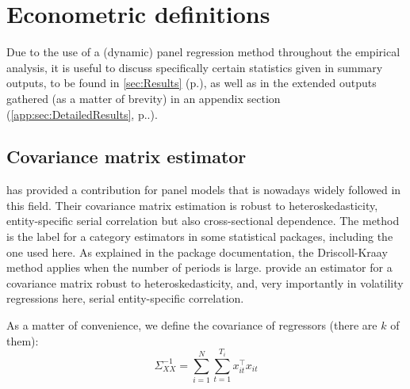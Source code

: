 \section{Econometric definitions}
\label{app:sec:EconometricDefinitions}
Due to the use of a (dynamic) panel regression method throughout the empirical analysis, it is useful to discuss specifically certain statistics given in summary outputs, to be found in \autoref{sec:Results} (p.\pageref{sec:Results}), as well as in the extended outputs gathered (as a matter of brevity) in an appendix section (\autoref{app:sec:DetailedResults}, p.\pageref{app:sec:DetailedResults}.).

\subsection{Covariance matrix estimator}
\textcite{Driscoll1998} has provided a contribution for panel models that is nowadays widely followed in this field. Their covariance matrix estimation is robust to heteroskedasticity, entity-specific serial correlation but also cross-sectional dependence. The method is the label for a category estimators in some statistical packages, including the one used here. As explained in the package documentation, the Driscoll-Kraay method applies when the number of periods is large. \textcite{Newey1987} provide an estimator for a covariance matrix robust to heteroskedasticity, and, very importantly in volatility regressions here, serial entity-specific correlation.

As a matter of convenience, we define the covariance of regressors (there are $k$ of them):
\begin{equation}
  \Sigma_{XX}^{-1} = \sum_{i = 1}^{N} \sum_{t = 1}^{T_{i}} x_{it}^\intercal x_{it}
\end{equation}

